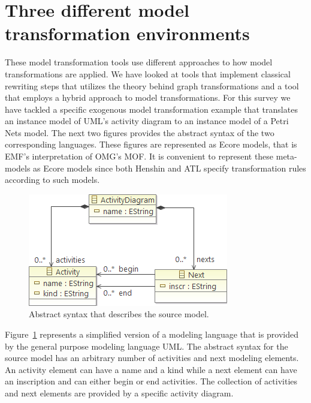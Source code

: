 \section{Three different model transformation environments}
\label{tools}

These model transformation tools use different approaches to how model
transformations are applied. We have looked at tools that implement classical
rewriting steps that utilizes the theory behind graph transformations and a tool
that employs a hybrid approach to model transformations. For this survey we have
tackled a specific exogenous model transformation example that translates an
instance model of UML's activity diagram to an instance model of a Petri
Nets\cite{jensen2007coloured} model. The next two figures provides the abstract
syntax of the two corresponding languages. These figures are represented as
Ecore models, that is EMF's interpretation of OMG's MOF. It is convenient to
represent these meta-models as Ecore models since both Henshin and ATL specify
transformation rules according to such models. 

\begin{figure}[H]
	\centering
	\includegraphics[scale=0.7]{./Figures/ActivityMetamodel.png}
	\caption[Abstract syntax of the source model]
	{Abstract syntax that describes the source model.}
	\label{fig:activity_metamodel}
\end{figure}

Figure~\ref{fig:activity_metamodel} represents a simplified version of a
modeling language that is provided by the general purpose modeling language UML.
The abstract syntax for the source model has an arbitrary number of activities
and next modeling elements. An activity element can have a name and a kind while
a next element can have an inscription and can either begin or end activities. The
collection of activities and next elements are provided by a specific activity
diagram.

